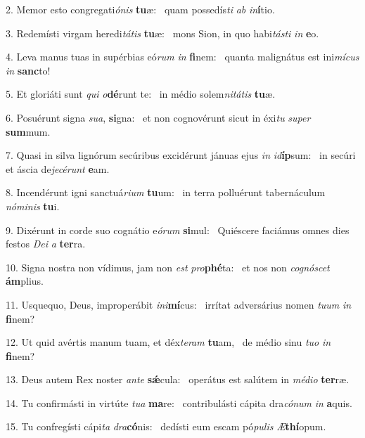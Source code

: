2. Memor esto congregati\textit{ó}\textit{nis} \textbf{tu}æ: \ast\  quam possedís\textit{ti} \textit{ab} \textit{in}\textbf{í}tio.\

3. Redemísti virgam heredi\textit{tá}\textit{tis} \textbf{tu}æ: \ast\  mons Sion, in quo habi\textit{tás}\textit{ti} \textit{in} \textbf{e}o.\

4. Leva manus tuas in supérbias eó\textit{rum} \textit{in} \textbf{fi}nem: \ast\  quanta malignátus est ini\textit{mí}\textit{cus} \textit{in} \textbf{sanc}to!\

5. Et gloriáti sunt \textit{qui} \textit{o}\textbf{dé}runt te: \ast\  in médio solem\textit{ni}\textit{tá}\textit{tis} \textbf{tu}æ.\

6. Posuérunt signa \textit{su}\textit{a}, \textbf{si}gna: \ast\  et non cognovérunt sicut in éxi\textit{tu} \textit{su}\textit{per} \textbf{sum}mum.\

7. Quasi in silva lignórum secúribus excidérunt jánuas ejus \textit{in} \textit{id}\textbf{íp}sum: \ast\  in secúri et áscia de\textit{je}\textit{cé}\textit{runt} \textbf{e}am.\

8. Incendérunt igni sanctuá\textit{ri}\textit{um} \textbf{tu}um: \ast\  in terra polluérunt tabernáculum \textit{nó}\textit{mi}\textit{nis} \textbf{tu}i.\

9. Dixérunt in corde suo cognátio e\textit{ó}\textit{rum} \textbf{si}mul: \ast\  Quiéscere faciámus omnes dies festos \textit{De}\textit{i} \textit{a} \textbf{ter}ra.\

10. Signa nostra non vídimus, jam non \textit{est} \textit{pro}\textbf{phé}ta: \ast\  et nos non \textit{co}\textit{gnó}\textit{scet} \textbf{ám}plius.\

11. Usquequo, Deus, improperábit \textit{in}\textit{i}\textbf{mí}cus: \ast\  irrítat adversárius nomen \textit{tu}\textit{um} \textit{in} \textbf{fi}nem?\

12. Ut quid avértis manum tuam, et déx\textit{te}\textit{ram} \textbf{tu}am, \ast\  de médio sinu \textit{tu}\textit{o} \textit{in} \textbf{fi}nem?\

13. Deus autem Rex noster \textit{an}\textit{te} \textbf{sǽ}cula: \ast\  operátus est salútem in \textit{mé}\textit{di}\textit{o} \textbf{ter}ræ.\

14. Tu confirmásti in virtúte \textit{tu}\textit{a} \textbf{ma}re: \ast\  contribulásti cápita dra\textit{có}\textit{num} \textit{in} \textbf{a}quis.\

15. Tu confregísti cápi\textit{ta} \textit{dra}\textbf{có}nis: \ast\  dedísti eum escam pó\textit{pu}\textit{lis} \textit{Æ}\textbf{thí}opum.\


